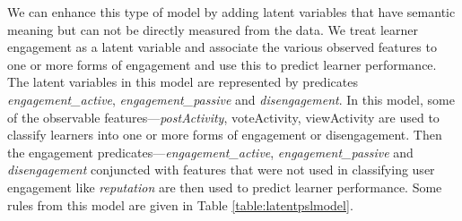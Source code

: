 
We can enhance this type of model by adding latent variables that have semantic meaning but can not be directly measured from the data. We treat learner engagement as a latent variable and associate the various observed features to one or more forms of engagement and use this to predict learner performance. The latent variables in this model are represented by predicates \textit{engagement\_active}, \textit{engagement\_passive} and \textit{disengagement}. In this model, some of the observable features---\emph{postActivity}, voteActivity, viewActivity are used to classify learners into one or more forms of engagement or disengagement. Then the engagement predicates---\textit{engagement\_active}, \textit{engagement\_passive} and \textit{disengagement} conjuncted with features that were not used in classifying user engagement like \emph{reputation} are then used to predict learner performance. Some rules from this model are given in Table \ref{table:latentpslmodel}.

